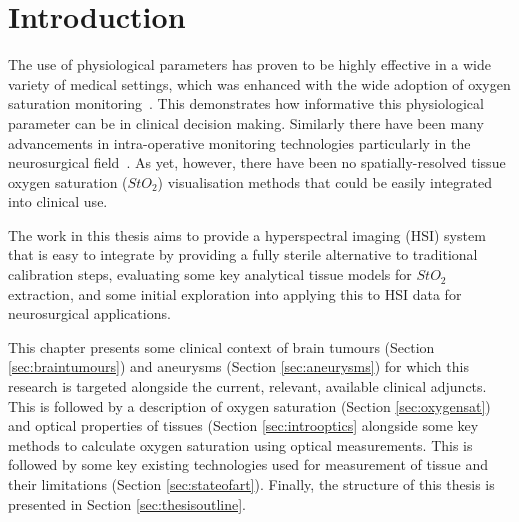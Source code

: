 \chapter{Introduction}
\label{chap:intro}
\minitoc

The use of physiological parameters has proven to be highly effective in a wide variety of medical settings, which was enhanced with the wide adoption of oxygen saturation monitoring~\citep{Williams2022}. This demonstrates how informative this physiological parameter can be in clinical decision making. Similarly there have been many advancements in intra-operative monitoring technologies particularly in the neurosurgical field~\citep{Raith2020}. As yet, however, there have been no spatially-resolved tissue oxygen saturation ($StO_2$) visualisation methods that could be easily integrated into clinical use. 

The work in this thesis aims to provide a hyperspectral imaging (HSI) system that is easy to integrate by providing a fully sterile alternative to traditional calibration steps, evaluating some key analytical tissue models for $StO_2$ extraction, and some initial exploration into applying this to HSI data for neurosurgical applications. 

This chapter presents some clinical context of brain tumours (Section \ref{sec:braintumours}) and aneurysms (Section \ref{sec:aneurysms}) for which this research is targeted alongside the current, relevant, available clinical adjuncts. This is followed by a description of oxygen saturation (Section \ref{sec:oxygensat}) and optical properties of tissues (Section \ref{sec:introoptics} alongside some key methods to calculate oxygen saturation using optical measurements. This is followed by some key existing technologies used for measurement of tissue and their limitations (Section \ref{sec:stateofart}). Finally, the structure of this thesis is presented in Section \ref{sec:thesisoutline}.

%
